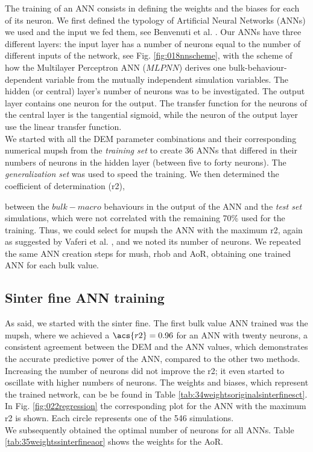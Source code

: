 The training of an \acs{ANN} consists in defining the weights and the biases for
each of its neuron.
We first defined the typology of Artificial Neural Networks (\acs{ANNs}) we used and
the input we fed them, see Benvenuti et al. \cite{RefWorks:205}.
Our \acs{ANNs} have three different layers: the input layer has a number of neurons
equal to the number of different inputs of the network, see Fig.
\ref{fig:018nnscheme}, with the scheme of how the Multilayer Perceptron \acs{ANN} ($MLPNN$) derives one
bulk-behaviour-dependent variable from the mutually independent simulation variables.
The hidden (or central) layer's number of neurons was to be investigated. 
The output layer contains one neuron for the output.
The transfer function for the neurons of the central layer is the tangential
sigmoid, while the neuron of the output layer use the linear transfer
function.\\

We started with all the \acs{DEM} parameter combinations and their corresponding
numerical \acs{mupsh} from the \textit{training set} to create 36 \acs{ANNs} that
differed in their numbers of neurons in the hidden layer (between five to forty neurons).
The \textit{generalization set} was used to speed the training. 
We then determined the coefficient of determination (\acs{r2}), 

between the
$bulk-macro$ behaviours in the output of the \acs{ANN} and the \textit{test
set} simulations, which were not correlated with the remaining 70\% used for the
training.
Thus, we could select for \acs{mupsh} the \acs{ANN} with the maximum \acs{r2}, 
again as suggested by Vaferi et al. \cite{RefWorks:150}, and we noted its number
of neurons.
We repeated the same \acs{ANN} creation steps for \acs{mush}, \acs{rhob}
and \acs{AoR}, obtaining one trained \acs{ANN} for each bulk value. \\

\subsection{Sinter fine ANN training}
\label{subsec:sinterfineanntraining}

As said, we started with the sinter fine.
The first bulk value \acs{ANN} trained was the \acs{mupsh}, where we achieved a
$\acs{r2} = 0.96$ for an \acs{ANN} with twenty neurons, a consistent agreement
between the \acs{DEM} and the \acs{ANN} values, which demonstrates the accurate predictive power of
the \acs{ANN}, compared to the other two methods.
Increasing the number of neurons did not improve the \acs{r2}; it even started to
oscillate with higher numbers of neurons.
The weights and biases, which represent the trained network, can be be found in
Table \ref{tab:34weightsoriginalsinterfinesct}.
In Fig. \ref{fig:022regression} the corresponding plot for the \acs{ANN} with the maximum \acs{r2} is shown. 
Each circle represents one of the 546 simulations. \\
We subsequently obtained the optimal number of neurons for all
\acs{ANNs}. Table \ref{tab:35weightssinterfineaor} shows the weights for the
\acs{AoR}.\\


